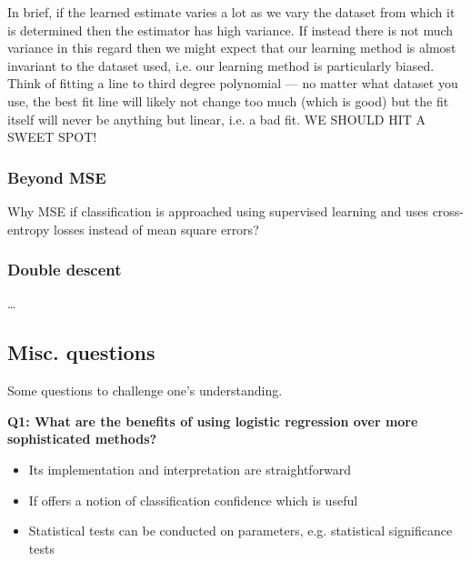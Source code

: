 \documentclass[11pt]{article}
\begin{document}
In brief, if the learned estimate varies a lot as we vary the dataset from which it is determined then the estimator has high variance. If instead there is not much variance in this regard then we might expect that our learning method is almost invariant to the dataset used, i.e. our learning method is particularly biased. Think of fitting a line to third degree polynomial — no matter what dataset you use, the best fit line will likely not change too much (which is good) but the fit itself will never be anything but linear, i.e. a bad fit. WE SHOULD HIT A SWEET SPOT!

\subsubsection{Beyond MSE}
Why MSE if classification is approached using supervised learning and uses cross-entropy losses instead of mean square errors?

\subsubsection{Double descent}
\dots

\subsection{Misc. questions}

Some questions to challenge one's understanding.

\begin{tcolorbox}[colback=c2]
\begin{center}
    \textbf{Q1: What are the benefits of using logistic regression over more sophisticated methods?}
\end{center}
\vspace{-8pt}
\begin{itemize}[label=\scriptsize\textbullet,left=0pt]
    \item Its implementation and interpretation are straightforward
    \item If offers a notion of classification confidence which is useful
    \item Statistical tests can be conducted on parameters, e.g. statistical significance tests
\end{itemize}
\end{tcolorbox}
\end{document}

